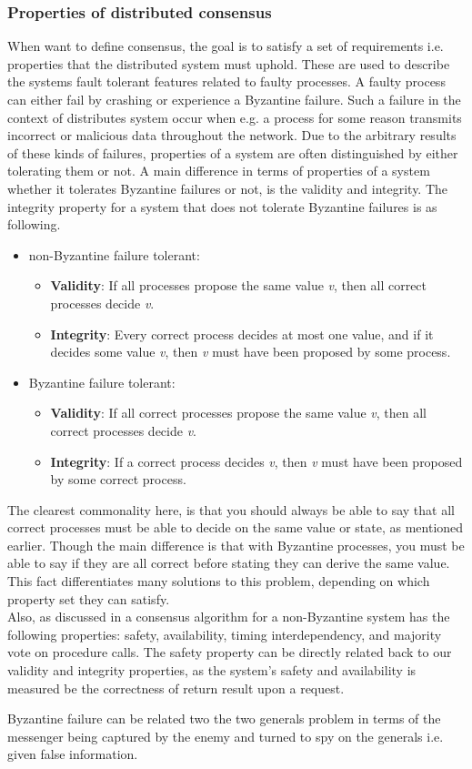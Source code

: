 \subsubsection{Properties of distributed consensus}
When want to define consensus, the goal is to satisfy a set of requirements i.e. properties that the distributed system must uphold. These are used to describe the systems fault tolerant features related to faulty processes. A faulty process can either fail by crashing or experience a Byzantine failure. Such a failure in the context of distributes system occur when e.g. a process for some reason transmits incorrect or malicious data throughout the network. Due to the arbitrary results of these kinds of failures, properties of a system are often distinguished by either tolerating them or not. A main difference in terms of properties of a system whether it tolerates Byzantine failures or not, is the validity and integrity. The integrity property for a system that does not tolerate Byzantine failures is as following\cite{DistributedSystems}.

\begin{itemize}
\item non-Byzantine failure tolerant:
	\begin{itemize}
	\item \textbf{Validity}: If all processes propose the same value \textit{v}, then all correct processes decide \textit{v}.
	\item \textbf{Integrity}: Every correct process decides at most one value, and if it decides some value \textit{v}, then \textit{v} must have been proposed by some process.
	\end{itemize}
\item Byzantine failure tolerant:
	\begin{itemize}
	\item \textbf{Validity}: If all correct processes propose the same value \textit{v}, then all correct processes decide \textit{v}.
	\item \textbf{Integrity}: If a correct process decides \textit{v}, then \textit{v} must have been proposed by some correct process.
	\end{itemize}
\end{itemize}

The clearest commonality here, is that you should always be able to say that all correct processes must be able to decide on the same value or state, as mentioned earlier. Though the main difference is that with Byzantine processes, you must be able to say if they are all correct before stating they can derive the same value. This fact differentiates many solutions to this problem, depending on which property set they can satisfy. \\
Also, as discussed in \cite{Raft} a consensus algorithm for a non-Byzantine system has the following properties: safety, availability, timing interdependency, and majority vote on procedure calls. The safety property can be directly related back to our validity and integrity properties, as the system's safety and availability is measured be the correctness of return result upon a request.

Byzantine failure can be related two the two generals problem in terms of the messenger being captured by the enemy and turned to spy on the generals i.e. given false information.


